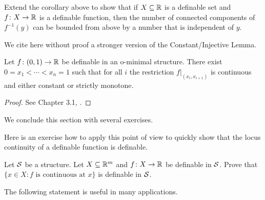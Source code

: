 \begin{exercise}
  Extend the corollary above to show that if $X\subseteq{\mathbb{R}}$ is a
  definable set and $f\colon X\rightarrow{\mathbb{R}}$ is a definable function,
  then the number of connected components of $f^{-1}(y)$ can be bounded
  from above by a number that is independent of $y$.  
\end{exercise}


We cite here without proof a stronger version of the
Constant/Injective Lemma.

\begin{theorem}
  \label{thm:monotone}
  Let $f\colon (0,1)\rightarrow{\mathbb{R}}$ be definable in an o-minimal
  structure. There exist $0=x_1<\cdots <x_n =1$
  such that for all $i$ the restriction  $f|_{(x_i,x_{i+1})}$
  is continuous and either constant or strictly monotone.
\end{theorem}
\begin{proof}
  See Chapter 3.1, \cite{D:oMin}. 
\end{proof}

We conclude this section with several exercises.

Here is an exercise how to apply this point of view to quickly show
that the locus continuity of a definable function is definable.

\begin{exercise}
  Let ${\mathcal S}$ be a structure. 
  Let $X\subseteq{\mathbb{R}}^m$  and $f\colon X\rightarrow{\mathbb{R}}$ be definable in ${\mathcal S}$.
  Prove that $\{ x \in X : f \text{ is continuous at }x\}$ is
  definable in ${\mathcal S}$.
\end{exercise}

The following statement is useful in many applications. 

